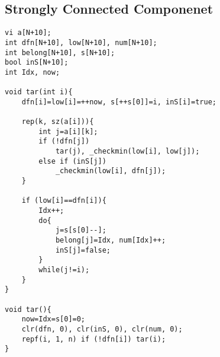 \subsection{Strongly Connected Componenet}
\begin{lstlisting}
vi a[N+10];
int dfn[N+10], low[N+10], num[N+10]; 
int belong[N+10], s[N+10]; 
bool inS[N+10]; 
int Idx, now; 
 
void tar(int i){ 
	dfn[i]=low[i]=++now, s[++s[0]]=i, inS[i]=true;

	rep(k, sz(a[i])){
		int j=a[i][k];
		if (!dfn[j])
			tar(j), _checkmin(low[i], low[j]);
		else if (inS[j])
			_checkmin(low[i], dfn[j]);
	}
 
    if (low[i]==dfn[i]){ 
        Idx++; 
        do{ 
            j=s[s[0]--]; 
            belong[j]=Idx, num[Idx]++;
            inS[j]=false; 
        } 
        while(j!=i);
    } 
} 

void tar(){
	now=Idx=s[0]=0;
	clr(dfn, 0), clr(inS, 0), clr(num, 0);
	repf(i, 1, n) if (!dfn[i]) tar(i);
}
\end{lstlisting}
